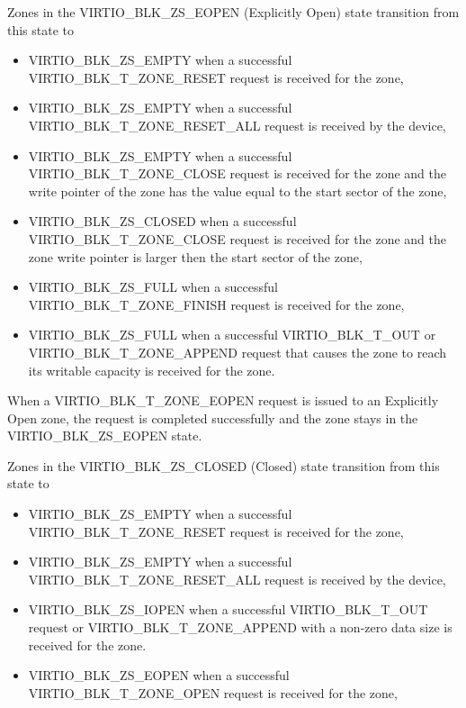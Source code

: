 Zones in the VIRTIO_BLK_ZS_EOPEN (Explicitly Open) state transition from
this state to
\begin{itemize}
\item VIRTIO_BLK_ZS_EMPTY when a successful VIRTIO_BLK_T_ZONE_RESET request is
    received for the zone,

\item VIRTIO_BLK_ZS_EMPTY when a successful VIRTIO_BLK_T_ZONE_RESET_ALL request
    is received by the device,

\item VIRTIO_BLK_ZS_EMPTY when a successful VIRTIO_BLK_T_ZONE_CLOSE request is
    received for the zone and the write pointer of the zone has the value equal
    to the start sector of the zone,

\item VIRTIO_BLK_ZS_CLOSED when a successful VIRTIO_BLK_T_ZONE_CLOSE request is
    received for the zone and the zone write pointer is larger then the start
    sector of the zone,

\item VIRTIO_BLK_ZS_FULL when a successful VIRTIO_BLK_T_ZONE_FINISH request is
    received for the zone,

\item VIRTIO_BLK_ZS_FULL when a successful VIRTIO_BLK_T_OUT or
    VIRTIO_BLK_T_ZONE_APPEND request that causes the zone to reach its writable
    capacity is received for the zone.
\end{itemize}

When a VIRTIO_BLK_T_ZONE_EOPEN request is issued to an Explicitly Open zone, the
request is completed successfully and the zone stays in the VIRTIO_BLK_ZS_EOPEN
state.

Zones in the VIRTIO_BLK_ZS_CLOSED (Closed) state transition from this state
to
\begin{itemize}
\item VIRTIO_BLK_ZS_EMPTY when a successful VIRTIO_BLK_T_ZONE_RESET request is
    received for the zone,

\item VIRTIO_BLK_ZS_EMPTY when a successful VIRTIO_BLK_T_ZONE_RESET_ALL request
    is received by the device,

\item VIRTIO_BLK_ZS_IOPEN when a successful VIRTIO_BLK_T_OUT request or
    VIRTIO_BLK_T_ZONE_APPEND with a non-zero data size is received for the zone.

\item VIRTIO_BLK_ZS_EOPEN when a successful VIRTIO_BLK_T_ZONE_OPEN request is
    received for the zone,
\end{itemize}

